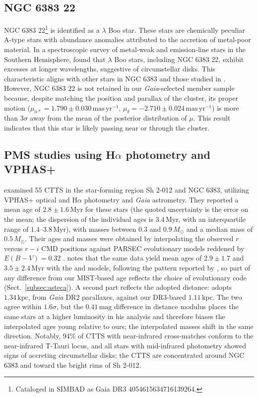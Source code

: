 \documentclass{aa}
\begin{document}
\subsection{NGC 6383 22}
NGC 6383 22\footnote{Cataloged in SIMBAD as Gaia DR3 4054615634716139264.} is identified as a $\lambda$ Boo star. These stars are chemically peculiar A-type stars with abundance anomalies attributed to the accretion of metal-poor material. In a spectroscopic survey of metal-weak and emission-line stars in the Southern Hemisphere, \citet{2020MNRAS.499.2701M} found that $\lambda$ Boo stars, including NGC 6383 22, exhibit excesses at longer wavelengths, suggestive of circumstellar disks. This characteristic aligns with other stars in NGC 6383 and those studied in \citet{2019MNRAS.484.5102K}. However, NGC 6383 22 is not retained in our \textit{Gaia}-selected member sample because, despite matching the position and parallax of the cluster, its proper motion ($\mu_{\alpha*} = 1.790 \pm 0.030\,\mathrm{mas\,yr^{-1}}$, $\mu_{\delta} = -2.710 \pm 0.024\,\mathrm{mas\,yr^{-1}}$) is more than $3\sigma$ away from the mean of the posterior distribution of $\mu$. This result indicates that this star is likely passing near or through the cluster.

\subsection{PMS studies using \texorpdfstring{H$\alpha$}{H-alpha} photometry and VPHAS+}

\citet{2019MNRAS.484.5102K} examined 55 CTTS in the star-forming region Sh 2-012 and NGC 6383, utilizing VPHAS+ optical and H$\alpha$ photometry and \textit{Gaia} astrometry. They reported a mean age of $2.8 \pm 1.6\,\mathrm{Myr}$ for these stars (the quoted uncertainty is the error on the mean; the dispersion of the individual ages is $3.4\,\mathrm{Myr}$, with an interquartile range of $1.4$--$3.8\,\mathrm{Myr}$), with masses between $0.3$ and $0.9\,M_\odot$ and a median mass of $0.5\,M_\odot$. Their ages and masses were obtained by interpolating the observed $r$ versus $r-i$ CMD positions against PARSEC evolutionary models reddened by $E(B-V)=0.32$ \citep{2012MNRAS.427..127B}\@. \citet{2019MNRAS.484.5102K} notes that the same data yield mean ages of $2.9\pm1.7$ and $3.5\pm2.4\,\mathrm{Myr}$ with the \citet{2011A&A...533A.109T} and \citet{2000A&A...358..593S} models, following the pattern reported by \citet{2015ApJ...808...23H}, so part of any difference from our MIST-based age reflects the choice of evolutionary code (Sect.~\ref{subsec:asteca}). A second part reflects the adopted distance: \citet{2019MNRAS.484.5102K} adopts $1.34\,\mathrm{kpc}$, from \textit{Gaia} DR2 parallaxes, against our DR3-based $1.11\,\mathrm{kpc}$. The two agree within $1.6\sigma$, but the $0.41\,\mathrm{mag}$ difference in distance modulus places the same stars at a higher luminosity in his analysis and therefore biases the interpolated ages young relative to ours; the interpolated masses shift in the same direction. Notably, $94\%$ of CTTS with near-infrared cross-matches conform to the near-infrared T-Tauri locus, and all stars with mid-infrared photometry showed signs of accreting circumstellar disks; the CTTS are concentrated around NGC 6383 and toward the bright rims of Sh 2-012.
\end{document}
